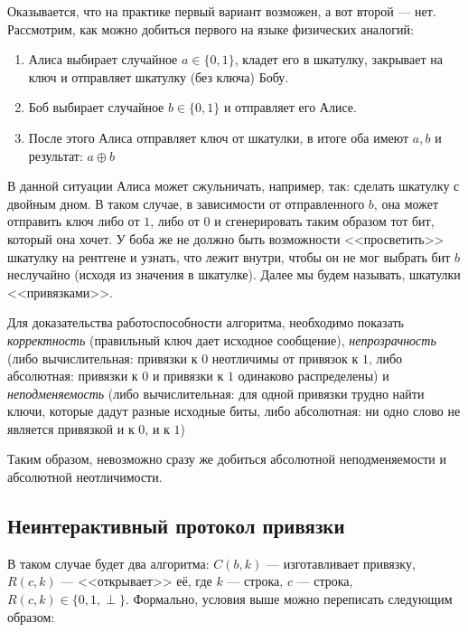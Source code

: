Оказывается, что на практике первый вариант возможен, а вот второй --- нет. Рассмотрим, как можно добиться первого на языке физических аналогий:

\begin{enumerate}
    \item Алиса выбирает случайное \(a \in \{0, 1\}\), кладет его в шкатулку, закрывает на ключ и отправляет шкатулку (без ключа) Бобу.
    \item Боб выбирает случайное \(b \in \{0, 1\}\) и отправляет его Алисе.
    \item После этого Алиса отправляет ключ от шкатулки, в итоге оба имеют \(a, b\) и результат: \(a \oplus b\)
\end{enumerate}

В данной ситуации Алиса может сжульничать, например, так: сделать шкатулку с двойным дном. В таком случае, в зависимости от отправленного \(b\), она может отправить ключ либо от \(1\), либо от \(0\) и сгенерировать таким образом тот бит, который она хочет. У боба же не должно быть возможности <<просветить>> шкатулку на рентгене и узнать, что лежит внутри, чтобы он не мог выбрать бит \(b\) неслучайно (исходя из значения в шкатулке). Далее мы будем называть, шкатулки <<привязками>>.

Для доказательства работоспособности алгоритма, необходимо показать \emph{корректность} (правильный ключ дает исходное сообщение), \emph{непрозрачность} (либо вычислительная: привязки к \(0\) неотличимы от привязок к \(1\), либо абсолютная: привязки к \(0\) и привязки к \(1\) одинаково распределены) и \emph{неподменяемость} (либо вычислительная: для одной привязки трудно найти ключи, которые дадут разные исходные биты, либо абсолютная: ни одно слово не является привязкой и к \(0\), и к \(1\))

\begin{note}
    Таким образом, невозможно сразу же добиться абсолютной неподменяемости и абсолютной неотличимости.
\end{note}

\subsection{Неинтерактивный протокол привязки}

В таком случае будет два алгоритма: \(C(b, k)\) --- изготавливает привязку, \(R(c, k)\) --- <<открывает>> её, где \(k\) --- строка, \(c\) --- строка, \(R(c, k) \in \{0, 1, \perp\}\). Формально, условия выше можно переписать следующим образом:

